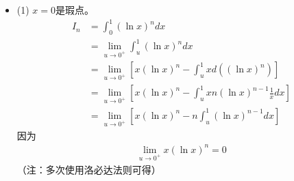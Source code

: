 \documentclass{article}
\begin{document}
\begin{itemize}
  \item (1)
        $x = 0$是瑕点。
        \begin{align*}
          I_n & = \int_{0}^{1} (\ln x)^n dx                                                                         \\
              & = \lim\limits_{u \to 0^+} \int_{u}^{1} (\ln x)^n dx                                                 \\
              & = \lim\limits_{u \to 0^+} \left[x (\ln x)^n - \int_{u}^{1} x  d((\ln x)^n) \right]                  \\
              & = \lim\limits_{u \to 0^+} \left[x (\ln x)^n - \int_{u}^{1} x n (\ln x)^{n-1} \frac{1}{x} dx \right] \\
              & = \lim\limits_{u \to 0^+} \left[x (\ln x)^n - n \int_{u}^{1}  (\ln x)^{n-1} dx \right]
        \end{align*}
        因为
        \begin{align*}
          \lim\limits_{u \to 0^+} x (\ln x)^n = 0
        \end{align*}
        （注：多次使用洛必达法则可得）


\end{itemize}
\end{document}
